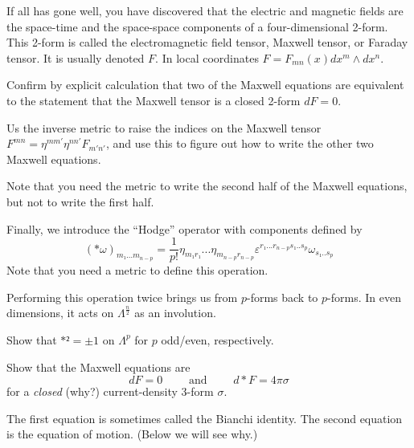 If all has gone well, you have discovered that the electric and magnetic fields are the space-time and the space-space components of a four-dimensional 2-form. This 2-form is called the electromagnetic field tensor, Maxwell tensor, or Faraday tensor. 
It is usually denoted $F$. In local coordinates $F=F_{mn}(x) dx^m \wedge dx^n$.
\begin{exercise}
Confirm by explicit calculation that two of the Maxwell equations are equivalent to the statement that the Maxwell tensor is a closed 2-form $dF=0$. 
\end{exercise}
\begin{exercise}
Us the inverse metric to raise the indices on the Maxwell tensor $F^{mn} = η^{mm'}η^{nn'} F_{m'n'}$, and use this to figure out how to write the other two Maxwell equations. 
\end{exercise}
Note that you need the metric to write the second half of the Maxwell equations, but not to write the first half.

Finally, we introduce the “Hodge” operator 
with components defined by
$$
(\ast ω)_{m₁ ... m_{n-p}} = \frac1{p!} η_{m₁ r₁} ... η_{m_{n-p} r_{n-p}} ε^{r₁ ... r_{n-p}s₁ .. s_p} ω_{s₁ .. s_p}
$$
Note that you need a metric to define this operation. 

Performing this operation twice brings us from $p$-forms back to $p$-forms. In even dimensions, it acts on $Λ^{\frac n2}$ as an involution. 
\begin{exercise}
Show that $\ast² =± 1$ on $Λ^p$ for $p$ odd/even, respectively. 
\end{exercise}
\begin{exercise}
Show that the Maxwell equations are 
$$
dF = 0 
\quad \quad \textrm{ and } \quad \quad 
d\ast F = 4π σ 
$$
for a {\em closed} (why?) current-density 3-form $σ$.
\end{exercise}
The first equation is sometimes called the Bianchi identity. The second equation is the equation of motion. (Below we will see why.)

